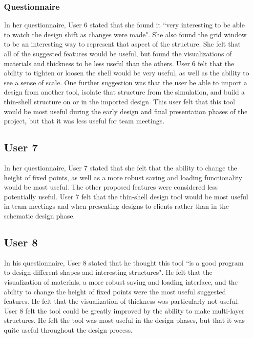 \documentclass{thesis}
\begin{document}
\subsubsection{Questionnaire}
In her questionnaire, User 6 stated that she found it ``very interesting to be able to watch the design shift as changes were made".
She also found the grid window to be an interesting way to represent that aspect of the structure.  She felt that all of the
suggested features would be useful, but found the visualizations of materials and thickness to be less useful than the others.
User 6 felt that the ability to tighten or loosen the shell would be very useful, as well as the ability to see a sense of scale.
One further suggestion was that the user be able to import a design from another tool, isolate that structure from the simulation,
and build a thin-shell structure on or in the imported design.  This user felt that this tool would be most useful during the early
design and final presentation phases of the project, but that it was less useful for team meetings.

\subsection{User 7}
In her questionnaire, User 7 stated that she felt that the ability to change the height of fixed points, as well as a more robust
saving and loading functionality would be most useful.  The other proposed features were considered less potentially useful.
User 7 felt that the thin-shell design tool would be most useful in team meetings and when presenting designs to clients rather than
in the schematic design phase.

\subsection{User 8}
In his questionnaire, User 8 stated that he thought this tool ``is a good program to design different shapes and interesting
structures".  He felt that the visualization of materials, a more robust saving and loading interface, and the ability to 
change the height of fixed points were the most useful suggested features.  He felt that the visualization of thickness was
particularly not useful.  User 8 felt the tool could be greatly improved by the ability to make multi-layer structures.
He felt the tool was most useful in the design phases, but that it was quite useful throughout the design process.
\end{document}
